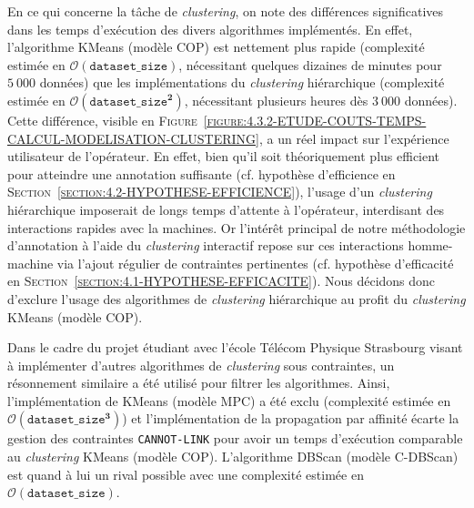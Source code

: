 			En ce qui concerne la tâche de \textit{clustering}, on note des différences significatives dans les temps d'exécution des divers algorithmes implémentés.
			En effet, l'algorithme KMeans (modèle COP) est nettement plus rapide (complexité estimée en $ \mathcal{O}(\texttt{dataset\_size}) $, nécessitant quelques dizaines de minutes pour $5~000$ données) que les implémentations du \textit{clustering} hiérarchique (complexité estimée en $ \mathcal{O}(\texttt{dataset\_size}^{\textbf{2}}) $, nécessitant plusieurs heures dès $3~000$ données).
			Cette différence, visible en \textsc{Figure~\ref{figure:4.3.2-ETUDE-COUTS-TEMPS-CALCUL-MODELISATION-CLUSTERING}}, a un réel impact sur l'expérience utilisateur de l'opérateur.
			En effet, bien qu'il soit théoriquement plus efficient pour atteindre une annotation suffisante (cf. hypothèse d'efficience en \textsc{Section~\ref{section:4.2-HYPOTHESE-EFFICIENCE}}), l'usage d'un \textit{clustering} hiérarchique imposerait de longs temps d'attente à l'opérateur, interdisant des interactions rapides avec la machines.
			Or l'intérêt principal de notre méthodologie d'annotation à l'aide du \textit{clustering} interactif repose sur ces interactions homme-machine via l'ajout régulier de contraintes pertinentes (cf. hypothèse d'efficacité en \textsc{Section~\ref{section:4.1-HYPOTHESE-EFFICACITE}}).
			Nous décidons donc d'exclure l'usage des algorithmes de \textit{clustering} hiérarchique au profit du \textit{clustering} KMeans (modèle COP).
			
			\begin{leftBarInformation}
				Dans le cadre du projet étudiant avec l'école Télécom Physique Strasbourg visant à implémenter d'autres algorithmes de \textit{clustering} sous contraintes, un résonnement similaire a été utilisé pour filtrer les algorithmes. Ainsi, l'implémentation de KMeans (modèle MPC) a été exclu (complexité estimée en $ \mathcal{O}(\texttt{dataset\_size}^{\textbf{3}}) $) et l'implémentation de la propagation par affinité écarte la gestion des contraintes \texttt{CANNOT-LINK} pour avoir un temps d'exécution comparable au \textit{clustering} KMeans (modèle COP).
				L'algorithme DBScan (modèle C-DBScan) est quand à lui un rival possible avec une complexité estimée en $ \mathcal{O}(\texttt{dataset\_size}) $.
			\end{leftBarInformation}
			
